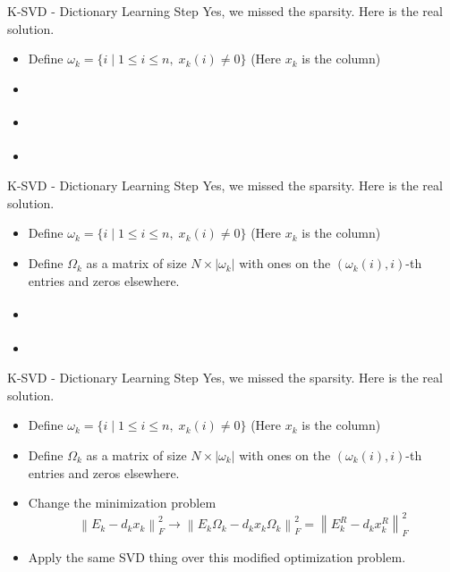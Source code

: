 \documentclass{beamer}
\begin{document}
\begin{frame}{K-SVD - Dictionary Learning Step}
Yes, we missed the sparsity. Here is the real solution. 
\begin{itemize}
    \item Define \( \omega_k = \{ i \mid 1 \leq i \leq n, \; x_k(i) \neq 0 \} \) (Here \(x_k \) is the column)
    \item[] \phantom{Define \( \Omega_k \) as a matrix of size \( N \times |\omega_k| \)
    with ones on the \( (\omega_k(i), i) \)-th entries and zeros elsewhere.}
    \item[] \mbox{}
    \[
    \phantom{\left\|E_k-d_kx_k\right\|_F^2 \rightarrow
    \left\|E_k\Omega_k-d_kx_k\Omega_k\right\|_F^2 =
    \left\| E_k^R - d_kx_k^R \right\|_F^2}
    \]
    \item[] \phantom{Apply the same SVD thing over this modified optimization problem.}
\end{itemize}
\end{frame}

\begin{frame}{K-SVD - Dictionary Learning Step}
Yes, we missed the sparsity. Here is the real solution. 
\begin{itemize}
    \item Define \( \omega_k = \{ i \mid 1 \leq i \leq n, \; x_k(i) \neq 0 \} \) (Here \(x_k \) is the column)
    \item Define \( \Omega_k \) as a matrix of size \( N \times |\omega_k| \)
    with ones on the \( (\omega_k(i), i) \)-th entries and zeros elsewhere.
    \item[] \mbox{}
    \[
    \phantom{\left\|E_k-d_kx_k\right\|_F^2 \rightarrow
    \left\|E_k\Omega_k-d_kx_k\Omega_k\right\|_F^2 =
    \left\| E_k^R - d_kx_k^R \right\|_F^2}
    \]
    \item[] \phantom{Apply the same SVD thing over this modified optimization problem.}
\end{itemize}
\end{frame}

\begin{frame}{K-SVD - Dictionary Learning Step}
Yes, we missed the sparsity. Here is the real solution. 
\begin{itemize}
    \item Define \( \omega_k = \{ i \mid 1 \leq i \leq n, \; x_k(i) \neq 0 \} \) (Here \(x_k \) is the column)
    \item Define \( \Omega_k \) as a matrix of size \( N \times |\omega_k| \) with ones on the \( (\omega_k(i), i) \)-th entries and zeros elsewhere.
    \item Change the minimization problem 
    \[
    \left\|E_k-d_kx_k\right\|_F^2 \rightarrow \left\|E_k\Omega_k-d_kx_k\Omega_k\right\|_F^2 = \left\| E_k^R - d_kx_k^R \right\|_F^2
    \]
    \item Apply the same SVD thing over this modified optimization problem.
\end{itemize}
\end{frame}
\end{document}

